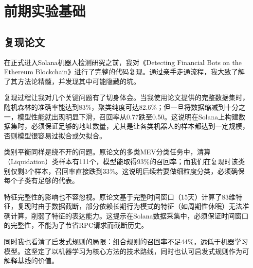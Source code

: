 \section{前期实验基础}

\subsection{复现论文}

\par 在正式进入Solana机器人检测研究之前，我对《Detecting Financial Bots on the Ethereum Blockchain》进行了完整的代码复现。通过亲手走通流程，我大致了解了其方法论精髓，并发现其中可能隐藏的坑。
\par 复现过程让我对几个关键问题有了切身体会。当我使用论文提供的完整数据集时，随机森林的准确率能达到83\%，聚类纯度可达82.6\%；但一旦将数据缩减到十分之一，模型性能就出现明显下滑，召回率从0.77跌至0.50。这说明在Solana上构建数据集时，必须保证足够的地址数量，尤其是让各类机器人的样本都达到一定规模，否则模型很容易过拟合或欠拟合。
\par 类别平衡同样是绕不开的问题。原论文的多类MEV分类任务中，清算（Liquidation）类样本有111个，模型能取得93\%的召回率；而我们在复现时该类别仅剩3个样本，召回率直接跌到33\%。这说明后续若要做细粒度分类，必须确保每个子类有足够的代表。
\par 特征完整性的影响也不容忽视。原论文基于完整时间窗口（15天）计算了83维特征，复现时由于数据截断，部分依赖长期行为模式的特征（如周期性休眠）无法准确计算，削弱了特征的表达能力。这提示在Solana数据采集中，必须保证时间窗口的完整性，不能为了节省RPC请求而截断历史。
\par 同时我也看清了启发式规则的局限：组合规则的召回率不足44\%，远低于机器学习模型。这坚定了以机器学习为核心方法的技术路线，同时也认可启发式规则作为可解释基线的价值。

